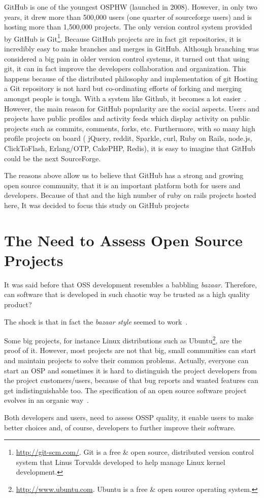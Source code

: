 GitHub is one of the youngest OSPHW (launched in 2008). 
However, in only two years, it drew more than 500,000 users (one quarter of sourceforge users) and is hosting more than 1,500,000 projects. 
The only version control system provided by GitHub is 
Git\footnote{\url{http://git-scm.com/}. 
  Git is a free \& open source, distributed version control system that Linus Torvalds developed to help manage Linux kernel development.
}.
Because GitHub projects are in fact git repositories, 
it is incredibly easy to make branches and merges in GitHub. 
Although branching was considered a big pain in older version control systems, 
it turned out that using git, it can in fact improve the developers collaboration and organization.
This happens because of the distributed philosophy and implementation of git
Hosting a Git repository is not hard but co-ordinating efforts of forking and merging amongst people is tough. 
With a system like Github, it becomes a lot easier~\cite{petercooper2010}.
However, the main reason for GitHub popularity are the social aspects.
Users and projects have public profiles and activity feeds which display activity on public projects such as commits, comments, forks, etc.
Furthermore, with so many high profile projects on board (
jQuery, 
reddit, 
Sparkle, 
curl, 
Ruby on Rails, 
node.js, 
ClickToFlash, 
Erlang/OTP, 
CakePHP, 
Redis), 
it is easy to imagine that GitHub could be the next SourceForge.

The reasons above allow us to believe that GitHub has a strong and growing open source community, 
that it is an important platform both for users and developers. 
Because of that and the high number of ruby on rails projects hosted here,
It was decided to focus this study on GitHub projects


\section{The Need to Assess Open Source Projects}

It was said before that OSS development resembles a babbling \textit{bazaar}.
Therefore, can software that is developed in such chaotic way be trusted as a high quality product?

The shock is that in fact the \textit{bazaar style} seemed to work~\cite{halloran2002high}.


Some big projects, for instance Linux distributions such as 
\textsf{Ubuntu}\footnote{\url{http://www.ubuntu.com}. Ubuntu is a free \& open source operating system.},
are the proof of it.
However, most projects are not that big, 
small communities can start and maintain projects to solve their common problems.
Actually, everyone can start an OSP and
sometimes it is hard to distinguish the project developers from the project customers/users,
because of that bug reports and wanted features can get indistinguishable too.
The specification of an open source software project evolves in an organic way~\cite{capiluppicathedral}.

Both developers and users, need to assess OSSP quality, it enable users to make better choices and, of course, developers to further improve their software.